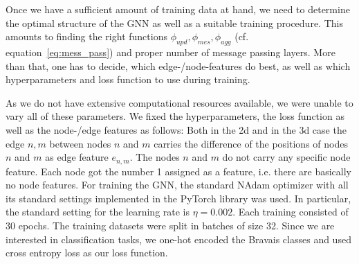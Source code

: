 \label{sec:implGNNBravais}
Once we have a sufficient amount of training data at hand, we need to determine the optimal structure of the GNN as well as
a suitable training procedure. 
This amounts to finding the right functions $\phi_{upd},\phi_{mes},\phi_{agg}$ (cf. equation~\ref{eq:mess_pass}) 
and proper number of message passing layers. More than that, one has to decide, which edge-/node-features 
do best, as well as which hyperparameters and loss function to use during training.

As we do not have extensive computational resources available, we were unable to vary all of these parameters.
We fixed the hyperparameters, the loss function as well as the node-/edge features as follows: 
Both in the 2d and in the 3d case the edge ${n,m}$ between nodes $n$ and $m$ 
carries the difference of the positions of nodes $n$ and $m$ as edge feature $e_{n,m}$.
The nodes $n$ and $m$ do not carry any specific node feature. Each node got the number 1 assigned as 
a feature, i.e. there are basically no node features.
For training the GNN, the standard NAdam optimizer with all its standard settings implemented in the PyTorch library was used.
In particular, the standard setting for the learning rate is $\eta=0.002$.
Each training consisted of 30 epochs. The training datasets were split in batches of size 32.
Since we are interested in classification tasks, we one-hot encoded the Bravais classes and used cross entropy loss as our loss function.

